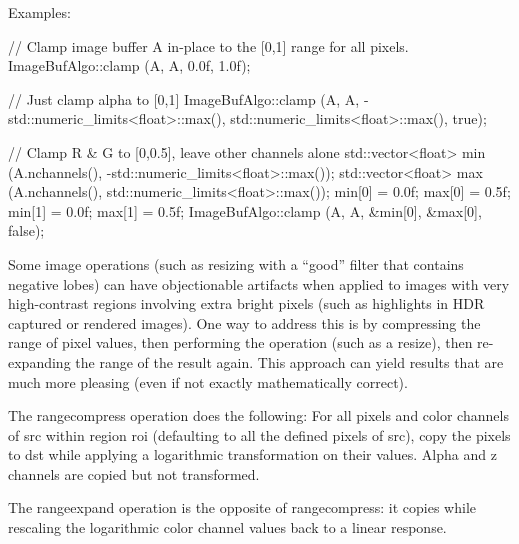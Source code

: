 \smallskip
\noindent Examples:
\begin{code}
    // Clamp image buffer A in-place to the [0,1] range for all pixels.
    ImageBufAlgo::clamp (A, A, 0.0f, 1.0f);

    // Just clamp alpha to [0,1]
    ImageBufAlgo::clamp (A, A, -std::numeric_limits<float>::max(),
                         std::numeric_limits<float>::max(), true);

    // Clamp R & G to [0,0.5], leave other channels alone
    std::vector<float> min (A.nchannels(), -std::numeric_limits<float>::max());
    std::vector<float> max (A.nchannels(), std::numeric_limits<float>::max());
    min[0] = 0.0f;  max[0] = 0.5f;
    min[1] = 0.0f;  max[1] = 0.5f;
    ImageBufAlgo::clamp (A, A, &min[0], &max[0], false);
\end{code}
\apiend


 
 

Some image operations (such as resizing with a ``good'' filter that
contains negative lobes) can have objectionable artifacts when applied
to images with very high-contrast regions involving extra bright pixels
(such as highlights in HDR captured or rendered images).  One way to
address this is by compressing the range of pixel values, then
performing the operation (such as a resize), then re-expanding the range
of the result again.  This approach can yield results that are much more
pleasing (even if not exactly mathematically correct).

The {\cf rangecompress} operation does the following: For all pixels and
color channels of {\cf src} within region {\cf roi} (defaulting to all
the defined pixels of {\cf src}), copy the pixels to {\cf dst}
while applying a logarithmic transformation on
their values.  Alpha and z channels are copied but not transformed.

The {\cf rangeexpand} operation is the opposite of {\cf rangecompress}: it
copies while rescaling the logarithmic color channel values back to a linear
response.

